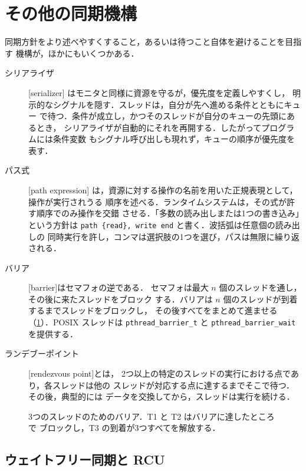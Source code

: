 \documentclass[../main.tex]{subfiles}
\begin{document}
\section{その他の同期機構}
\label{sec:l10-other}

同期方針をより述べやすくすること，あるいは待つこと自体を避けることを目指す
機構が，ほかにもいくつかある．
\begin{description}
  \item[シリアライザ] [serializer]
    \cite{hewitt1979}はモニタと同様に資源を守るが，優先度を定義しやすくし，
    明示的なシグナルを隠す．スレッドは，自分が先へ進める条件とともにキュー
    で待つ．条件が成立し，かつそのスレッドが自分のキューの先頭にあるとき，
    シリアライザが自動的にそれを再開する．したがってプログラムには条件変数
    もシグナル呼び出しも現れず，キューの順序が優先度を表す．
  \item[パス式] [path expression]\cite{campbell1974}
    は，資源に対する操作の名前を用いた正規表現として，操作が実行されうる
    順序を述べる．ランタイムシステムは，その式が許す順序でのみ操作を交錯
    させる．「多数の読み出しまたは1つの書き込み」という方針は
    \texttt{path \{read\}, write end} と書く．波括弧は任意個の読み出しの
    同時実行を許し，コンマは選択肢の1つを選び，パスは無限に繰り返される．
  \item[バリア] [barrier]はセマフォの逆である．
    セマフォは最大 $n$ 個のスレッドを通し，その後に来たスレッドをブロック
    する．バリアは $n$ 個のスレッドが到着するまでスレッドをブロックし，
    その後すべてをまとめて進ませる（\cref{fig:l10-barrier}）．POSIX
    スレッドは \texttt{pthread\_barrier\_t} と
    \texttt{pthread\_barrier\_wait} を提供する．
  \item[ランデブーポイント]
    [rendezvous point]とは，
    2つ以上の特定のスレッドの実行における点であり，各スレッドは他の
    スレッドが対応する点に達するまでそこで待つ．その後，典型的には
    データを交換してから，スレッドは実行を続ける．
\end{description}

\begin{figure}[htbp]
  \centering
  
  \caption{3つのスレッドのためのバリア．T1 と T2 はバリアに達したところで
    ブロックし，T3 の到着が3つすべてを解放する．}
  \label{fig:l10-barrier}
\end{figure}

\subsection{ウェイトフリー同期と RCU}
\end{document}
